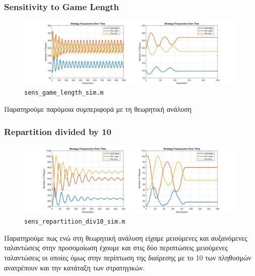 \subsubsection{Sensitivity to Game Length}
\begin{figure}[th!]
\centering
\includegraphics[width=1\linewidth]{fit_plots_simulations/sensitivity_to_game_length_sim}
\caption{\texttt{sens\_game\_length\_sim.m}}
\label{fig:sensitivitytogamelengthsim}
\end{figure}

Παρατηρούμε παρόμοια συμπεριφορά με τη θεωρητική ανάλυση

\subsubsection{Repartition divided by 10}
\begin{figure}[th!]
\centering
\includegraphics[width=0.7\linewidth]{fit_plots_simulations/repartition_div10_sim}
\caption{\texttt{sens\_repartition\_div10\_sim.m}}
\label{fig:repartitiondiv10sim}
\end{figure}

Παρατηρούμε πως ενώ στη θεωρητική ανάλυση είχαμε μειούμενες και αυξανόμενες ταλαντώσεις στην προσομοίωση έχουμε και στις δύο περιπτώσεις μειούμενες ταλαντώσεις οι οποίες όμως στην περίπτωση της διαίρεσης  με το 10 των πληθυσμών ανατρέπουν και την κατάταξη των στρατηγικών.




